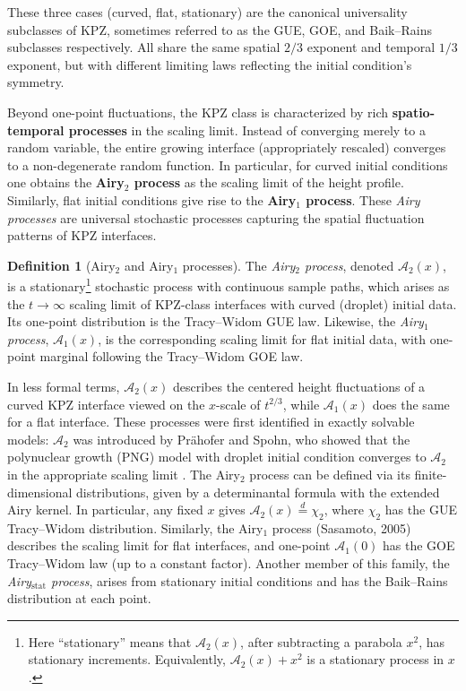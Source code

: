 \documentclass[letterpaper,11pt,oneside,reqno]{article}
\numberwithin{equation}{section}
\theoremstyle{definition}
\newtheorem{definition}[proposition]{Definition}
\begin{document}
These three cases (curved, flat, stationary) are the canonical universality subclasses of KPZ, sometimes referred to as the GUE, GOE, and Baik–Rains subclasses respectively. All share the same spatial $2/3$ exponent and temporal $1/3$ exponent, but with different limiting laws reflecting the initial condition's symmetry.

Beyond one-point fluctuations, the KPZ class is characterized by rich \textbf{spatio-temporal processes} in the scaling limit. Instead of converging merely to a random variable, the entire growing interface (appropriately rescaled) converges to a non-degenerate random function. In particular, for curved initial conditions one obtains the \textbf{Airy$_2$ process} as the scaling limit of the height profile. Similarly, flat initial conditions give rise to the \textbf{Airy$_1$ process}. These \emph{Airy processes} are universal stochastic processes capturing the spatial fluctuation patterns of KPZ interfaces.

\begin{definition}[Airy$_2$ and Airy$_1$ processes]
The \emph{Airy$_2$ process}, denoted $\mathcal{A}_2(x)$, is a stationary\footnote{Here “stationary” means that $\mathcal{A}_2(x)$, after subtracting a parabola $x^2$, has stationary increments. Equivalently, $\mathcal{A}_2(x) + x^2$ is a stationary process in $x$.} stochastic process with continuous sample paths, which arises as the $t\to\infty$ scaling limit of KPZ-class interfaces with curved (droplet) initial data. Its one-point distribution is the Tracy–Widom GUE law. Likewise, the \emph{Airy$_1$ process}, $\mathcal{A}_1(x)$, is the corresponding scaling limit for flat initial data, with one-point marginal following the Tracy–Widom GOE law.
\end{definition}

\noindent In less formal terms, $\mathcal{A}_2(x)$ describes the centered height fluctuations of a curved KPZ interface viewed on the $x$-scale of $t^{2/3}$, while $\mathcal{A}_1(x)$ does the same for a flat interface. These processes were first identified in exactly solvable models: $\mathcal{A}_2$ was introduced by Prähofer and Spohn, who showed that the polynuclear growth (PNG) model with droplet initial condition converges to $\mathcal{A}_2$ in the appropriate scaling limit \cite{remenik2023integrable}. The Airy$_2$ process can be defined via its finite-dimensional distributions, given by a determinantal formula with the extended Airy kernel. In particular, any fixed $x$ gives $\mathcal{A}_2(x)\stackrel{d}{=}\chi_2$, where $\chi_2$ has the GUE Tracy–Widom distribution. Similarly, the Airy$_1$ process (Sasamoto, 2005) describes the scaling limit for flat interfaces, and one-point $\mathcal{A}_1(0)$ has the GOE Tracy–Widom law (up to a constant factor). Another member of this family, the \emph{Airy$_{\mathrm{stat}}$ process}, arises from stationary initial conditions and has the Baik–Rains distribution at each point.
\end{document}
